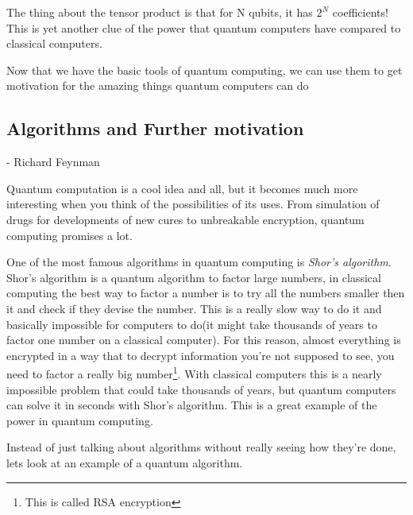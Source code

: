 \documentclass[english, a4paper, 12pt, twoside]{article}
\numberwithin{equation}{section} %
\begin{document}
The thing about the tensor product is that for N qubits, it has $2^N$ coefficients! This is yet another clue of the power that quantum computers have compared to classical computers. 

Now that we have the basic tools of quantum computing, we can use them to get motivation for the amazing things quantum computers can do

\subsection{Algorithms and Further motivation}
 \begin{quotation}
 \end{quotation}
\centerline{- Richard Feynman}
Quantum computation is a cool idea and all, but it becomes much more interesting when you think of the possibilities of its uses. From simulation of drugs for developments of new cures to unbreakable encryption, quantum computing promises a lot. 

One of the most famous algorithms in quantum computing is \textit{Shor's algorithm}. Shor's algorithm is a quantum algorithm to factor large numbers, in classical computing the best way to factor a number is to try all the numbers smaller then it and check if they devise the number. This is a really slow way to do it and basically impossible for computers to do(it might take thousands of years to factor one number on a classical computer). For this reason, almost everything is encrypted in a way that to decrypt information you're not supposed to see, you need to factor a really big number\footnote{This is called RSA encryption}. With classical computers this is a nearly impossible problem that could take thousands of years, but quantum computers can solve it in seconds with Shor's algorithm. This is a great example of the power in quantum computing.

Instead of just talking about algorithms without really seeing how they're done, lets look at an example of a quantum algorithm.
\end{document}

